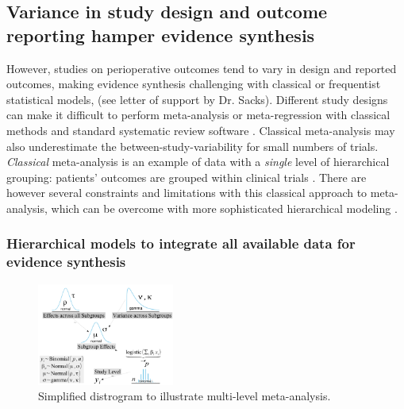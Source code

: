 \documentclass[11pt,notitlepage]{article}
\begin{document}
\subsection*{Variance in study design and outcome reporting hamper evidence synthesis}
However, studies on perioperative outcomes tend to vary in design and reported outcomes\cite{Andreae2013}, making evidence synthesis challenging with classical or frequentist statistical models\cite{Spiegelhalter_11134920}, (see letter of support by Dr. Sacks). Different study designs can make it difficult to perform meta-analysis or meta-regression with classical methods and standard systematic review software \cite{Deeks2011chapter}. Classical meta-analysis may also underestimate the between-study-variability for small numbers of trials\cite{Song2012,Cornell2014,Andreae2015}. \textit{Classical} meta-analysis is an example of data with a \textit{single} level of hierarchical grouping: patients' outcomes are grouped within clinical trials \cite{egger2008systematic}. There are however several constraints and limitations with this classical approach to meta-analysis, which can be overcome with more sophisticated hierarchical modeling  \cite{Andreae2015,Thompson2002,Abroug2011}. 

\subsubsection*{Hierarchical models to integrate all available data for evidence synthesis}

\begin{figure} 
\includegraphics[width=0.4\textwidth]{Figures/DistrogramMetaAnalysis.pdf} 
\caption{\footnotesize Simplified distrogram to illustrate multi-level meta-analysis.}
\label{fig:MetaAnalysis}
\end{figure}
\end{document}
